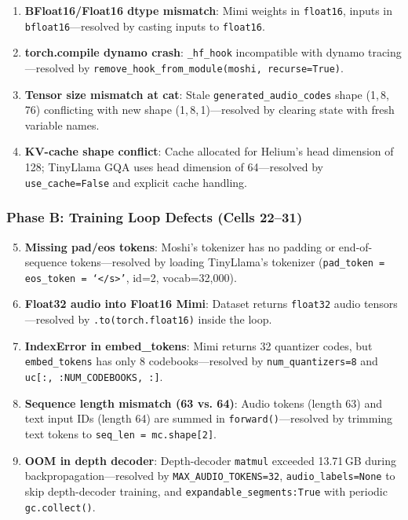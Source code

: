 \documentclass[conference]{IEEEtran}
\begin{document}
\begin{enumerate}
  \item \textbf{BFloat16/Float16 dtype mismatch}: Mimi weights in \texttt{float16},
        inputs in \texttt{bfloat16}---resolved by casting inputs to \texttt{float16}.
  \item \textbf{torch.compile dynamo crash}: \texttt{\_hf\_hook} incompatible with
        dynamo tracing---resolved by \texttt{remove\_hook\_from\_module(moshi, recurse=True)}.
  \item \textbf{Tensor size mismatch at cat}: Stale \texttt{generated\_audio\_codes}
        shape (1,\,8,\,76) conflicting with new shape (1,\,8,\,1)---resolved
        by clearing state with fresh variable names.
  \item \textbf{KV-cache shape conflict}: Cache allocated for Helium's head
        dimension of 128; TinyLlama GQA uses head dimension of 64---resolved
        by \texttt{use\_cache=False} and explicit cache handling.
\end{enumerate}

\subsubsection{Phase B: Training Loop Defects (Cells 22--31)}

\begin{enumerate}
  \setcounter{enumi}{4}
  \item \textbf{Missing pad/eos tokens}: Moshi's tokenizer has no padding or
        end-of-sequence tokens---resolved by loading TinyLlama's tokenizer
        (\texttt{pad\_token = eos\_token = `</s>'}, id=2, vocab=32,000).
  \item \textbf{Float32 audio into Float16 Mimi}: Dataset returns \texttt{float32}
        audio tensors---resolved by \texttt{.to(torch.float16)} inside the loop.
  \item \textbf{IndexError in embed\_tokens}: Mimi returns 32 quantizer codes, but
        \texttt{embed\_tokens} has only 8 codebooks---resolved by
        \texttt{num\_quantizers=8} and \texttt{uc[:, :NUM\_CODEBOOKS, :]}.
  \item \textbf{Sequence length mismatch (63 vs. 64)}: Audio tokens (length 63)
        and text input IDs (length 64) are summed in \texttt{forward()}---resolved
        by trimming text tokens to \texttt{seq\_len = mc.shape[2]}.
  \item \textbf{OOM in depth decoder}: Depth-decoder \texttt{matmul} exceeded
        13.71\,GB during backpropagation---resolved by \texttt{MAX\_AUDIO\_TOKENS=32},
        \texttt{audio\_labels=None} to skip depth-decoder training, and
        \texttt{expandable\_segments:True} with periodic \texttt{gc.collect()}.
\end{enumerate}
\end{document}
